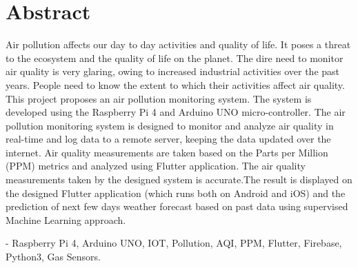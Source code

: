 \chapter*{Abstract}
\bigskip
\begin{onehalfspace}
{\en Air pollution affects our day to day activities and quality of life. It poses a threat to the ecosystem and the quality of life on the planet. The dire need to monitor air quality is very glaring, owing to increased industrial activities over the past years. People need to know the extent to which their activities affect air quality. This project proposes an air pollution monitoring system. The system is developed using the Raspberry Pi 4 and Arduino UNO micro-controller. The air pollution monitoring system is designed to monitor and analyze air quality in real-time and log data to a remote server, keeping the data updated over the internet. Air quality measurements are taken based on the Parts per Million (PPM) metrics and analyzed using Flutter application. The air quality measurements taken by the designed system is accurate.The result is displayed on the designed Flutter application (which runs both on Android and iOS) and the prediction of next few days weather forecast based on past data using supervised Machine Learning approach.


} 
\end{onehalfspace}




\bigskip

 - {\en Raspberry Pi 4, Arduino UNO, IOT, Pollution,  AQI, PPM, Flutter, Firebase, Python3, Gas Sensors.}



